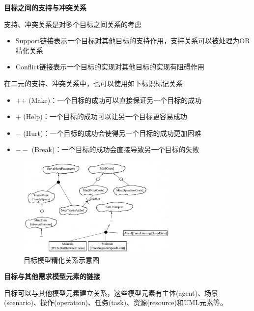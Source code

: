 \textbf{目标之间的支持与冲突关系} \par
支持、冲突关系是对多个目标之间关系的考虑
\begin{itemize}
    \item Support链接表示一个目标对其他目标的支持作用，支持关系可以被处理为OR精化关系
    \item Conflict链接表示一个目标的实现对其他目标的实现有阻碍作用  
\end{itemize}

在二元的支持、冲突关系中，也可以使用如下标识标记关系
\begin{itemize}
    \item ++ (Make)：一个目标的成功可以直接保证另一个目标的成功
    \item + (Help)：一个目标的成功可以让另一个目标更容易成功
    \item $-$ (Hurt)：一个目标的成功会使得另一个目标的成功更加困难
    \item $--$ (Break)：一个目标的成功会直接导致另一个目标的失败
\end{itemize}

\begin{figure}[H]
	\centering
	\includegraphics[width=0.7\textwidth]{img/目标模型精化关系示意图.png}
    \caption*{目标模型精化关系示意图}
\end{figure}
\vspace{-1em}

\textbf{目标与其他需求模型元素的链接} \par
目标可以与其他模型元素建立关系，这些模型元素有主体(agent)、场景(scenario)、操作(operation)、任务(task)、资源(resource)和UML元素等。

